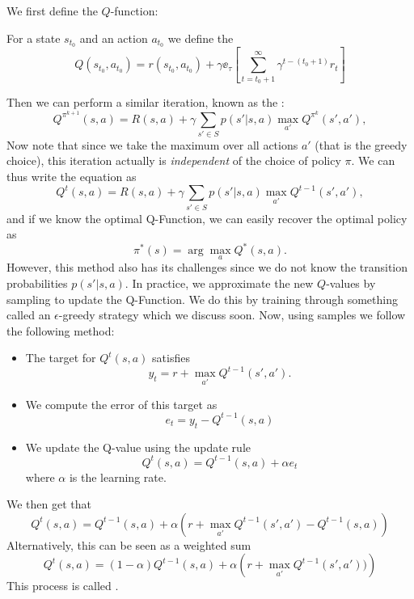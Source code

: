\documentclass[11pt]{scrartcl}
\begin{document}
We first define the $Q$-function:
\begin{defn}
For a state $s_{t_0}$ and an action $a_{t_0}$ we define the  
\begin{equation*}
    Q(s_{t_0},a_{t_0}) = r(s_{t_0},a_{t_0}) + \gamma \ee_{\tau} \left[\sum_{t = t_{0} + 1}^{\infty} \gamma^{t - (t_0 + 1)}r_t \right]
\end{equation*}
\end{defn}
Then we can perform a similar iteration, known as the :
\begin{equation*}
    Q^{\pi^{k+1}}(s,a) = R(s,a) + \gamma \sum_{s' \in S}p(s'|s,a) \max_{a'}Q^{\pi^k}(s',a'),
\end{equation*}
Now note that since we take the maximum over all actions $a'$ (that is the greedy choice), this iteration actually is \textit{independent} of the choice of policy $\pi$. We can thus write the equation as
\begin{equation*}
    Q^{t}(s,a) = R(s,a) + \gamma \sum_{s' \in S}p(s'|s,a) \max_{a'}Q^{t-1}(s',a'),
\end{equation*}
and if we know the optimal Q-Function, we can easily recover the optimal policy as
\begin{equation*}
    \pi^*(s) = \arg\max_{a}Q^*(s,a).
\end{equation*}
However, this method also has its challenges since we do not know the transition probabilities $p(s'|s,a)$. In practice, we approximate the new $Q$-values by sampling to update the Q-Function. We do this by training through something called an $\epsilon$-greedy strategy which we discuss soon. Now, using samples we follow the following method:
\begin{itemize}
\item The target for $Q^t(s,a)$ satisfies
\begin{equation*}
    y_t = r + \max_{a'} Q^{t-1}(s',a').
\end{equation*}
\item We compute the error of this target as
\begin{equation*}
    e_t = y_t - Q^{t-1}(s,a)
\end{equation*}
\item We update the Q-value using the update rule
\begin{equation*}
    Q^t(s,a) = Q^{t-1}(s,a) + \alpha e_t
\end{equation*}
where $\alpha$ is the learning rate. 
\end{itemize}
We then get that $$Q^{t}(s,a)= Q^{t-1}(s,a)+\alpha\left(r+\max_{a'}Q^{t-1}(s',a')-Q^{t-1}(s,a)\right)$$
Alternatively, this can be seen as a weighted sum
$$Q^{t}(s,a)= (1-\alpha)Q^{t-1}(s,a)+\alpha\left(r+\max_{a'}Q^{t-1}(s',a'))\right)$$
This process is called . 
\end{document}
